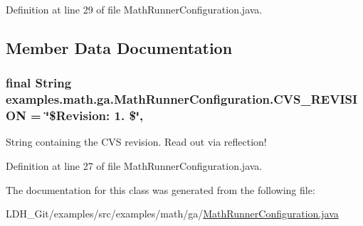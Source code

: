 Definition at line 29 of file Math\-Runner\-Configuration.\-java.



\subsection{Member Data Documentation}
\hypertarget{classexamples_1_1math_1_1ga_1_1_math_runner_configuration_a03e7d61f1be50cf43a91e12b9508b5f7}{
\subsubsection[{C\-V\-S\-\_\-\-R\-E\-V\-I\-S\-I\-O\-N}]{\setlength{\rightskip}{0pt plus 5cm}final String examples.\-math.\-ga.\-Math\-Runner\-Configuration.\-C\-V\-S\-\_\-\-R\-E\-V\-I\-S\-I\-O\-N = \char`\"{}\$Revision\-: 1. \$\char`\"{}\hspace{0.3cm}{\ttfamily [static]}, {\ttfamily [private]}}}\label{classexamples_1_1math_1_1ga_1_1_math_runner_configuration_a03e7d61f1be50cf43a91e12b9508b5f7}
String containing the C\-V\-S revision. Read out via reflection! 

Definition at line 27 of file Math\-Runner\-Configuration.\-java.



The documentation for this class was generated from the following file\-:\begin{DoxyCompactItemize}
\item 
L\-D\-H\-\_\-\-Git/examples/src/examples/math/ga/\hyperlink{_math_runner_configuration_8java}{Math\-Runner\-Configuration.\-java}\end{DoxyCompactItemize}

